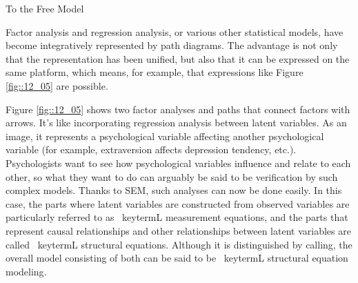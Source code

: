 \documentclass{ltjsbook}
\begin{document}
To the Free Model

Factor analysis and regression analysis, or various other statistical models, have become integratively represented by path diagrams. The advantage is not only that the representation has been unified, but also that it can be expressed on the same platform, which means, for example, that expressions like Figure \ref{fig::12_05} are possible.



Figure \ref{fig::12_05} shows two factor analyses and paths that connect factors with arrows. It's like incorporating regression analysis between latent variables. As an image, it represents a psychological variable affecting another psychological variable (for example, extraversion affects depression tendency, etc.). Psychologists want to see how psychological variables influence and relate to each other, so what they want to do can arguably be said to be verification by such complex models. Thanks to SEM, such analyses can now be done easily. In this case, the parts where latent variables are constructed from observed variables are particularly referred to as \ keytermL {measurement equations}, and the parts that represent causal relationships and other relationships between latent variables are called \ keytermL {structural equations}. Although it is distinguished by calling, the overall model consisting of both can be said to be \ keytermL {structural equation modeling}.
\end{document}
